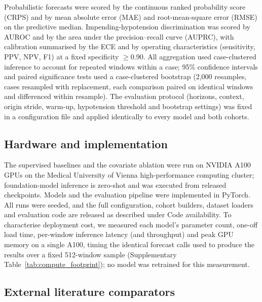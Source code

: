 \documentclass[11pt]{article}
\begin{document}
Probabilistic forecasts were scored by the continuous ranked probability
score (CRPS) and by mean absolute error (MAE) and root-mean-square error
(RMSE) on the predictive median. Impending-hypotension discrimination was
scored by AUROC and by the area under the precision--recall curve (AUPRC),
with calibration summarised by the ECE and by operating characteristics (sensitivity,
PPV, NPV, F1) at a fixed specificity $\geq$0.90. All aggregation used
case-clustered inference to account for repeated windows within a case; 95\%
confidence intervals and paired significance tests used a case-clustered
bootstrap (2{,}000 resamples, cases resampled with replacement, each
comparison paired on identical windows and differenced within resample).
The evaluation protocol (horizons, context, origin stride, warm-up,
hypotension threshold and bootstrap settings) was fixed in a configuration
file and applied identically to every model and both cohorts.

\subsection{Hardware and implementation}

The supervised baselines and the covariate ablation were run on NVIDIA A100
GPUs on the Medical University of Vienna high-performance computing cluster;
foundation-model inference is zero-shot and was executed from released
checkpoints. Models and the evaluation pipeline were implemented in PyTorch.
All runs were seeded, and the full configuration, cohort builders, dataset
loaders and evaluation code are released as described under Code
availability. To characterise deployment cost, we measured each model's
parameter count, one-off load time, per-window inference latency (and
throughput) and peak GPU memory on a single A100, timing the identical
forecast calls used to produce the results over a fixed 512-window sample
(Supplementary Table~\ref{tab:compute_footprint}); no model was retrained for
this measurement.

\subsection{External literature comparators}
\end{document}
